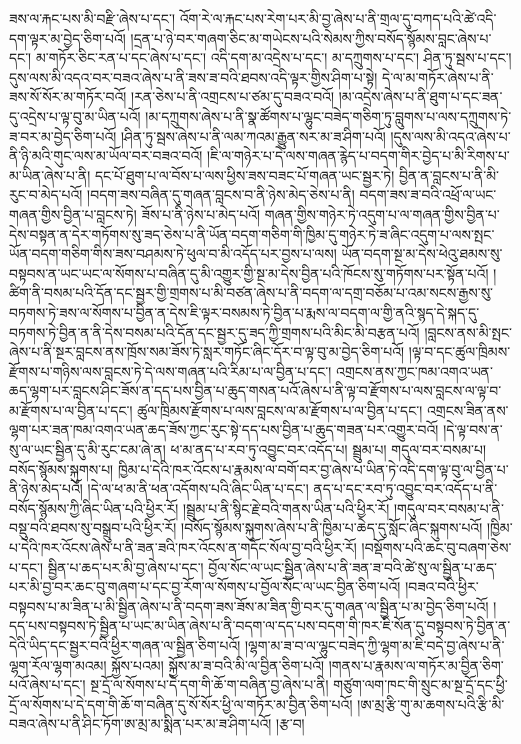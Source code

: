 ཟས་ལ་རྐང་པས་མི་བརྫི་ཞེས་པ་དང་། འོག་རེ་ལ་རྐང་པས་རེག་པར་མི་བྱ་ཞེས་པ་ནི་གྲལ་དུ་བཀད་པའི་ཚེ་འདི་དག་ལྟར་མ་བྱེད་ཅིག་པའོ། །དྲན་པ་ཉེ་བར་གཞག་ཅིང་མ་གཡེངས་པའི་སེམས་ཀྱིས་བསོད་སྙོམས་བླང་ཞེས་པ་དང་། མ་གཏོར་ཅིང་རན་པ་དང་ཞེས་པ་དང་། འདི་དག་མ་འདྲེས་པ་དང་། མ་དཀྲུགས་པ་དང་། ཤིན་ཏུ་སྦས་པ་དང་། དུས་ལས་མི་འདའ་བར་བཟའ་ཞེས་པ་ནི་ཟས་ཟ་བའི་ཐབས་འདི་ལྟར་གྱིས་ཤིག་པ་སྟེ། དེ་ལ་མ་གཏོར་ཞེས་པ་ནི་ཟས་སོ་སོར་མ་གཏོར་བའོ། །རན་ཅེས་པ་ནི་འགྲངས་པ་ཙམ་དུ་བཟའ་བའོ། །མ་འདྲེས་ཞེས་པ་ནི་ཐུག་པ་དང་ཟན་དུ་འདྲེས་པ་ལྟ་བུ་མ་ཡིན་པའོ། །མ་དཀྲུགས་ཞེས་པ་ནི་སྣ་ཚོགས་པ་ལྷུང་བཟེད་གཅིག་ཏུ་བླུགས་པ་ལས་དཀྲུགས་ཏེ་ཟ་བར་མ་བྱེད་ཅིག་པའོ། །ཤིན་ཏུ་སྦས་ཞེས་པ་ནི་ལམ་ཀའམ་རྒྱུན་སར་མ་ཟ་ཤིག་པའོ། །དུས་ལས་མི་འདའ་ཞེས་པ་ནི་ཉི་མའི་གུང་ལས་མ་ཡོལ་བར་བཟའ་བའོ། །ཇི་ལ་གཉེར་པ་དེ་ལས་གཞན་རྙེད་པ་བདག་གིར་བྱེད་པ་མི་རིགས་པ་མ་ཡིན་ཞེས་པ་ནི། དང་པོ་ཐུག་པ་ལ་བོས་པ་ལས་ཕྱིས་ཟས་བཟང་པོ་གཞན་ཡང་སྦྱར་ཏེ། བྱིན་ན་བླངས་པ་ནི་མི་རུང་བ་མེད་པའོ། །བདག་ཟས་བཞིན་དུ་གཞན་བླངས་བ་ནི་ཉེས་མེད་ཅེས་པ་ནི། བདག་ཟས་ཟ་བའི་འཕྲོ་ལ་ཡང་གཞན་གྱིས་བྱིན་པ་བླངས་ཏེ། ཟོས་པ་ནི་ཉེས་པ་མེད་པའོ། གཞན་གྱིས་གཉེར་ཏེ་འདུག་པ་ལ་གཞན་གྱིས་བྱིན་པ་དེས་བསྟན་ན་དེར་གཏོགས་སུ་ཟད་ཅེས་པ་ནི་ཡོན་བདག་གཅིག་གི་ཁྱིམ་དུ་གཉེར་ཏེ་ཟ་ཞིང་འདུག་པ་ལས་སྤང་ཡོན་བདག་གཅིག་གིས་ཟས་བཤམས་ཏེ་ཕུལ་བ་མི་འདོད་པར་བྱས་པ་ལས། ཡོན་བདག་སྔ་མ་དེས་ཕེའུ་ཐམས་སུ་བསྟབས་ན་ཡང་ཡང་ལ་སོགས་པ་བཞིན་དུ་མི་འགྱུར་གྱི་སྔ་མ་དེས་བྱིན་པའི་ཁོངས་སུ་གཏོགས་པར་སྟོན་པའོ། །ཚིག་ནི་བསམ་པའི་དོན་དང་སྦྱར་གྱི་གྲགས་པ་མི་བཙན་ཞེས་པ་ནི་བདག་ལ་དགྲ་བཅོམ་པ་འམ་སངས་རྒྱས་སུ་བཏགས་ཏེ་ཟས་ལ་སོགས་པ་བྱིན་ན་དེས་ཇི་ལྟར་བསམས་ཏེ་བྱིན་པ་རྨས་ལ་བདག་ལ་གྱི་ནའི་སྙད་དེ་སྐད་དུ་བཏགས་ཏེ་བྱིན་ན་ནི་དེས་བསམ་པའི་དོན་དང་སྦྱར་དུ་ཟད་ཀྱི་གྲགས་པའི་མིང་མི་བརྩན་པའོ། །བླངས་ནས་མི་སྤང་ཞེས་པ་ནི་སྔར་བླངས་ནས་ཁྲོས་སམ་ཟོས་ཏེ་སླར་གཏོང་ཞིང་དོར་བ་ལྟ་བུ་མ་བྱེད་ཅིག་པའོ། །ལྟ་བ་དང་ཚུལ་ཁྲིམས་རྫོགས་པ་གཉིས་ལས་བླངས་ཏེ་དེ་ལས་གཞན་པའི་རིམ་པ་ལ་བྱིན་པ་དང་། འགྲངས་ནས་ཀྱང་ཁམ་འགའ་ཡན་ཆད་ལྷག་པར་བླངས་ཤིང་ཟོས་ན་དད་པས་བྱིན་པ་ཆུད་གསན་པའོ་ཞེས་པ་ནི་ལྟ་བ་རྫོགས་པ་ལས་བླངས་ལ་ལྟ་བ་མ་རྫོགས་པ་ལ་བྱིན་པ་དང་། ཚུལ་ཁྲིམས་རྫོགས་པ་ལས་བླངས་ལ་མ་རྫོགས་པ་ལ་བྱིན་པ་དང་། འགྲངས་ཟིན་ནས་ལྷག་པར་ཟན་ཁམ་འགའ་ཡན་ཆད་ཟོས་ཀྱང་རུང་སྟེ་དད་པས་བྱིན་པ་ཆུད་གཟན་པར་འགྱུར་བའོ། །དེ་ལྟ་བས་ན་སུ་ལ་ཡང་སྦྱིན་དུ་མི་རུང་ངམ་ཞེ་ན། ཕ་མ་ནད་པ་རབ་ཏུ་འབྱུང་བར་འདོད་པ། སྦྲུམ་པ། གདུལ་བར་བསམ་པ། བསོད་སྙོམས་སྐུགས་པ། ཁྱིམ་པ་དེའི་ཁར་འོངས་པ་རྣམས་ལ་བགོ་བར་བྱ་ཞེས་པ་ཡིན་ཏེ་འདི་དག་ལྟ་བུ་ལ་བྱིན་པ་ནི་ཉེས་མེད་པའོ། །དེ་ལ་ཕ་མ་ནི་ཕན་འདོགས་པའི་ཞིང་ཡིན་པ་དང་། ནད་པ་དང་རབ་ཏུ་འབྱུང་བར་འདོད་པ་ནི་བསོད་སྙོམས་ཀྱི་ཞིང་ཡིན་པའི་ཕྱིར་རོ། །སྦྲུམ་པ་ནི་སྙིང་རྗེ་བའི་གནས་ཡིན་པའི་ཕྱིར་རོ། །གདུལ་བར་བསམ་པ་ནི་བསྡུ་བའི་ཐབས་སུ་བསྒྲུབ་པའི་ཕྱིར་རོ། །བསོད་སྙོམས་སྐུགས་ཞེས་པ་ནི་ཁྱིམ་པ་ཆེད་དུ་སློང་ཞིང་སྐུགས་པའོ། །ཁྱིམ་པ་དེའི་ཁར་འོངས་ཞེས་པ་ནི་ཟན་ཟའི་ཁར་འོངས་ན་གདོང་སོལ་བྱ་བའི་ཕྱིར་རོ། །བསྡོགས་པའི་ཆང་བུ་བཞག་ཅེས་པ་དང་། སྦྱིན་པ་ཆད་པར་མི་བྱ་ཞེས་པ་དང་། བྱོལ་སོང་ལ་ཡང་སྦྱིན་ཞེས་པ་ནི་ཟན་ཟ་བའི་ཚེ་སུ་ལ་སྦྱིན་པ་ཆད་པར་མི་བྱ་བར་ཆང་བུ་གཞག་པ་དང་བྱ་རོག་ལ་སོགས་པ་བྱོལ་སོང་ལ་ཡང་བྱིན་ཅིག་པའོ། །བཟའ་བའི་ཕྱིར་བསྟབས་པ་མ་ཟིན་པ་མི་སྦྱིན་ཞེས་པ་ནི་བདག་ཟས་ཟོས་མ་ཟིན་གྱི་བར་དུ་གཞན་ལ་སྦྱིན་པ་མ་བྱེད་ཅིག་པའོ། །དད་པས་བསྟབས་ཏེ་སྦྱིན་པ་ཡང་མ་ཡིན་ཞེས་པ་ནི་བདག་ལ་དད་པས་བདག་གི་ཁར་ཇི་སོན་དུ་བསྟབས་ཏེ་བྱིན་ན་དེའི་ཡིད་དང་སྦྱར་བའི་ཕྱིར་གཞན་ལ་སྦྱིན་ཅིག་པའོ། །ལྷག་མ་ཟ་བ་ལ་ལྷུང་བཟེད་ཀྱི་ལྷག་མ་ཇི་བདེ་བྱ་ཞེས་པ་ནི་ལྷག་རོལ་ལྷག་མའམ། སྐྱོས་པའམ། སྐྱོས་མ་ཟ་བའི་མི་ལ་བྱིན་ཅིག་པའོ། །གནས་པ་རྣམས་ལ་གཏོར་མ་བྱིན་ཅིག་པའོ་ཞེས་པ་དང་། སྔ་དྲོ་ལ་སོགས་པ་དེ་དག་གི་ཆོ་ག་བཞིན་བྱ་ཞེས་པ་ནི། གཙུག་ལག་ཁང་གི་སྲུང་མ་སྔ་དྲོ་དང་ཕྱི་དྲོ་ལ་སོགས་པ་དེ་དག་གི་ཆོ་ག་བཞིན་དུ་སོ་སོར་ཕྱི་ལ་གཏོར་མ་བྱིན་ཅིག་པའོ། །ཨ་མྲ་རྩི་གུ་མ་ཆགས་པའི་རྩི་མི་བཟའ་ཞེས་པ་ནི་ཤིང་ཏོག་ཨ་མྲ་མ་སྨིན་པར་མ་ཟ་ཤིག་པའོ། །རྩ་བ། 
